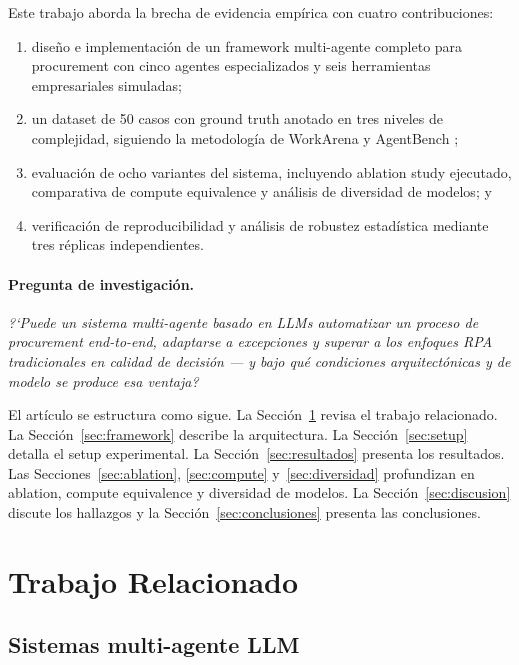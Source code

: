 \documentclass[preprint,12pt,authoryear]{elsarticle}
\begin{document}
Este trabajo aborda la brecha de evidencia emp\'irica con cuatro contribuciones:
\begin{enumerate}[label=(\arabic*)]
  \item dise\~no e implementaci\'on de un framework multi-agente completo para
        procurement con cinco agentes especializados y seis herramientas
        empresariales simuladas;
  \item un dataset de 50 casos con ground truth anotado en tres niveles de
        complejidad, siguiendo la metodolog\'ia de WorkArena
        \citep{drouin2024workarena} y AgentBench \citep{liu2023agentbench};
  \item evaluaci\'on de ocho variantes del sistema, incluyendo ablation study
        ejecutado, comparativa de compute equivalence y an\'alisis de
        diversidad de modelos; y
  \item verificaci\'on de reproducibilidad y an\'alisis de robustez estad\'istica
        mediante tres r\'eplicas independientes.
\end{enumerate}

\paragraph{Pregunta de investigaci\'on.}
\textit{?`Puede un sistema multi-agente basado en LLMs automatizar un proceso
de procurement end-to-end, adaptarse a excepciones y superar a los enfoques RPA
tradicionales en calidad de decisi\'on --- y bajo qu\'e condiciones
arquitect\'onicas y de modelo se produce esa ventaja?}

El art\'iculo se estructura como sigue. La Secci\'on~\ref{sec:relacionado}
revisa el trabajo relacionado. La Secci\'on~\ref{sec:framework} describe la
arquitectura. La Secci\'on~\ref{sec:setup} detalla el setup experimental.
La Secci\'on~\ref{sec:resultados} presenta los resultados. Las
Secciones~\ref{sec:ablation}, \ref{sec:compute} y~\ref{sec:diversidad}
profundizan en ablation, compute equivalence y diversidad de modelos.
La Secci\'on~\ref{sec:discusion} discute los hallazgos y la
Secci\'on~\ref{sec:conclusiones} presenta las conclusiones.

\section{Trabajo Relacionado}
\label{sec:relacionado}

\subsection{Sistemas multi-agente LLM}
\end{document}
